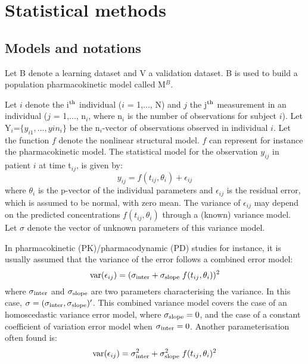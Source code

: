 \section{Statistical methods} \label{sec:npde}

\subsection{Models and notations}

\hskip 18pt Let B denote a learning dataset and V a validation dataset. B is used to build a population pharmacokinetic model called M$^B$.

Let $i$ denote the i$^{\rm th}$ individual ($i$ = 1,..., N) and $j$ the j$^{\rm th}$ measurement in an individual ($j$ = 1,..., n$_i$, where n$_i$ is the number of observations for subject $i$). Let Y$_i$=$\{y_{i1},...,y{in_i} \}$ be the n$_i$-vector of observations observed in individual $i$. Let the function $f$ denote the nonlinear structural model. $f$ can represent for instance the pharmacokinetic model. The statistical model for the observation $y_{ij}$ in patient $i$ at time t$_{ij}$, is given by:
\begin{equation}
y_{ij}=f(t_{ij},\theta_i)+\epsilon_{ij}
\end{equation}
where $\theta_i$ is the p-vector of the individual parameters and $\epsilon_{ij}$ is the residual error, which is assumed to be normal, with zero mean. The variance of $\epsilon_{ij}$ may depend on the predicted concentrations $f(t_{ij},\theta_i)$ through a (known) variance model. Let $\sigma$ denote the vector of unknown parameters of this variance model.

In pharmacokinetic (PK)/pharmacodynamic (PD) studies for instance, it is usually assumed that the variance of the error follows a combined error model:
\begin{equation}
\var(\epsilon_{ij})= (\sigma_{\rm inter} + \sigma_{\rm slope} \;
f(t_{ij},\theta_i))^2 \label{eq:errormod}
\end{equation}
where $\sigma_{\rm inter}$ and $\sigma_{\rm slope}$ are two parameters characterising the variance. In this case, $\sigma=(\sigma_{\rm inter},\sigma_{\rm slope})'$. This combined variance model covers the case of an homoscedastic variance error model, where $\sigma_{\rm slope}=0$, and the case of a constant coefficient of variation error model when $\sigma_{\rm inter}=0$. Another parameterisation often found is:
\begin{equation}
\hbox{var}(\epsilon_{ij})= \sigma_{\rm inter}^2 + \sigma_{\rm slope}^2 \;
f(t_{ij},\theta_i)^2
\end{equation}

